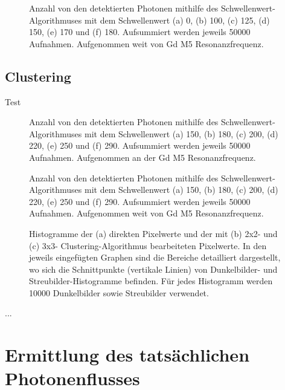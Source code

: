 \begin{figure}[H]
    \centering
    
    \caption{Anzahl von den detektierten Photonen mithilfe des Schwellenwert-Algorithmuses mit dem Schwellenwert (a) \SI{0}{\adu}, (b) \SI{100}{\adu}, (c) \SI{125}{\adu}, (d) \SI{150}{\adu}, (e) \SI{170}{\adu} und (f) \SI{180}{\adu}. Aufsummiert werden jeweils \num{50000} Aufnahmen. Aufgenommen weit von Gd M5 Resonanzfrequenz.}
    \label{fig:th_0_100_125_150_170_180_off_resonance}
\end{figure}
\subsection{Clustering}
\noindent
Test
\begin{figure}[H]
    \centering
    
    \caption{Anzahl von den detektierten Photonen mithilfe des Schwellenwert-Algorithmuses mit dem Schwellenwert (a) \SI{150}{\adu}, (b) \SI{180}{\adu}, (c) \SI{200}{\adu}, (d) \SI{220}{\adu}, (e) \SI{250}{\adu} und (f) \SI{290}{\adu}. Aufsummiert werden jeweils \num{50000} Aufnahmen. Aufgenommen an der Gd M5 Resonanzfrequenz.}
    \label{fig:th_0_100_125_150_170_180_resonance}
\end{figure}

\begin{figure}[H]
    \centering
    
    \caption{Anzahl von den detektierten Photonen mithilfe des Schwellenwert-Algorithmuses mit dem Schwellenwert (a) \SI{150}{\adu}, (b) \SI{180}{\adu}, (c) \SI{200}{\adu}, (d) \SI{220}{\adu}, (e) \SI{250}{\adu} und (f) \SI{290}{\adu}. Aufsummiert werden jeweils \num{50000} Aufnahmen. Aufgenommen weit von Gd M5 Resonanzfrequenz.}
    \label{fig:th_0_100_125_150_170_180_off_resonance}
\end{figure}
\begin{figure}[H]
    \centering
    
    \caption{Histogramme der (a) direkten Pixelwerte und der mit (b) 2x2- und (c) 3x3- Clustering-Algorithmus bearbeiteten Pixelwerte. In den jeweils eingefügten Graphen sind die Bereiche detailliert dargestellt, wo sich die Schnittpunkte (vertikale Linien) von Dunkelbilder- und Streubilder-Histogramme befinden. Für jedes Histogramm werden \num{10000} Dunkelbilder sowie Streubilder verwendet.}
    \label{fig:no_pr_cl_2_cl_3_histograms}
\end{figure}
...
\section{Ermittlung des tatsächlichen Photonenflusses}
\label{text:butterfly_counting}

